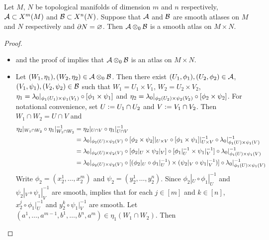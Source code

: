 \documentclass{book}
\begin{document}
\begin{ex} 
	Let $M$, $N$ be topological manifolds of dimension $m$ and $n$ respectively, $\mathcal{A} \subset X^m(M)$ and $\mathcal{B} \subset X^n(N)$. Suppose that $\mathcal{A}$ and $\mathcal{B}$ are smooth atlases on $M$ and $N$ respectively and $\partial N = \varnothing$. Then $\mathcal{A} \otimes_0 \mathcal{B}$ is a smooth atlas on $M \times N$. 
\end{ex}

\begin{proof}\
	\begin{itemize}
		\item {} and the proof of  implies that $\mathcal{A} \otimes_0 \mathcal{B}$ is an atlas on $M \times N$. 
		\item Let $(W_1, \eta_1), (W_2, \eta_2) \in \mathcal{A} \otimes_0 \mathcal{B}$. Then there exist $(U_1, \phi_1), (U_2, \phi_2)\in \mathcal{A}$, $(V_1, \psi_1), (V_2, \psi_2) \in \mathcal{B}$ such that $W_1 = U_1 \times V_1$, $W_2 = U_2 \times V_2$, $\eta_1 = \lambda_0|_{\phi_1(U_1) \times \psi_1(V_1)} \circ [\phi_1 \times \psi_1]$ and $\eta_2 = \lambda_0|_{\phi_2(U_2) \times \psi_2(V_2)} \circ [\phi_2 \times \psi_2]$. For notational convenience, set $U \vcentcolon= U_1 \cap U_2$ and $V \vcentcolon= V_1 \cap V_2$. Then $W_1 \cap W_2 = U \cap V$ and
		\begin{align*}
			\eta_2|_{W_1 \cap W_2} \circ \eta_1|_{W_1 \cap W_2}^{-1}
			& = \eta_2|_{U \cap V} \circ \eta_1|_{U \cap V}^{-1} \\
			& = \lambda_0|_{\phi_2(U) \times \psi_2(V)} \circ [\phi_2 \times \psi_2]|_{U \times V} \circ [\phi_1 \times \psi_1]|_{U \times V}^{-1} \circ \lambda_0|_{\phi_1(U) \times \psi_1(V)}^{-1} \\
			& = \lambda_0|_{\phi_2(U) \times \psi_2(V)} \circ [\phi_2|_U \times \psi_2|_V] \circ [\phi_1|_U^{-1} \times \psi_1|_V^{-1}] \circ \lambda_0|_{\phi_1(U) \times \psi_1(V)}^{-1} \\
			& = \lambda_0|_{\phi_2(U) \times \psi_2(V)} \circ [(\phi_2|_U \circ \phi_1|_U^{-1}) \times( \psi_2|_V \circ \psi_1|_V^{-1})] \circ \lambda_0|_{\phi_1(U) \times \psi_1(V)}^{-1} 
		\end{align*} 
		Write $\phi_2 = (x_2^1, \ldots, x_2^m)$ and $\psi_2 = (y_2^1, \ldots, y_2^n)$. Since $\phi_2|_U \circ \phi_1|_U^{-1}$ and $\psi_2|_V \circ \psi_1|_V^{-1}$ are smooth,  implies that for each $j \in [m]$ and $k \in [n]$, $x_2^j \circ \phi_1|_U^{-1}$ and $y_2^k \circ \psi_1|_V^{-1}$ are smooth. Let $(a^1, \ldots, a^{m-1}, b^1, \ldots, b^n, a^m) \in \eta_1(W_1 \cap W_2)$. Then

\end{itemize}
\end{proof}
\end{document}
